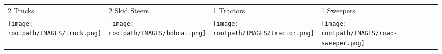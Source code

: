 \begin{tabular}{m{}m{}m{}m{}}
    {\color{ccorange} 2 Trucks} & {\color{ccorange} 2 Skid Steers} & {\color{ccorange} 1 Tractors} & {\color{ccorange} 1 Sweepers} \\
    \texttt{[image: \\rootpath/IMAGES/truck.png]}  & \texttt{[image: \\rootpath/IMAGES/bobcat.png]} & \texttt{[image: \\rootpath/IMAGES/tractor.png]} & \texttt{[image: \\rootpath/IMAGES/road-sweeper.png]}                         
    \end{tabular}